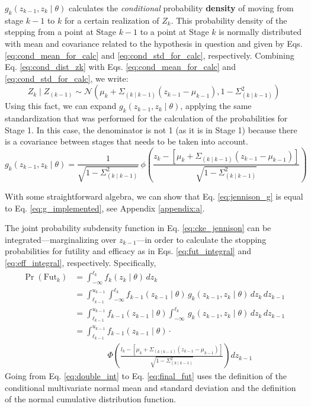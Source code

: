 \documentclass{article}
\begin{document}
$g_k(z_{k-1},z_k\mid \theta)$ calculates the \textit{conditional} probability \textbf{density} of moving from stage $k-1$ to $k$ for a certain realization of $Z_k$. This probability density of the stepping from a point at Stage $k-1$ to a point at Stage $k$ is normally distributed with mean and covariance related to the hypothesis in question and given by Eqs. \eqref{eq:cond_mean_for_calc} and \eqref{eq:cond_std_for_calc}, respectively. Combining Eq. \eqref{eq:cond_dist_zk} with Eqs. \eqref{eq:cond_mean_for_calc} and \eqref{eq:cond_std_for_calc}, we write:
%
\begin{equation}
    Z_{k}\mid Z_{(k-1)} \sim \mathcal{N}\left(\mu_k + \Sigma_{(k \mid k-1)}(z_{k-1} - \mu_{k-1}), 1 - \Sigma_{(k \mid k-1)}^2\right)
\end{equation}
%
Using this fact, we can expand $g_k(z_{k-1},z_k\mid \theta)$, applying the same standardization that was performed for the calculation of the probabilities for Stage 1. In this case, the denominator is not 1 (as it is in Stage 1) because there is a covariance between stages that needs to be taken into account.
%
\begin{equation} \label{eq:g_implemented}
    g_k(z_{k-1},z_k\mid \theta) = \frac{1}{\sqrt{1 - \Sigma_{(k \mid k-1)}^2}}\,\phi\left(\frac{z_k-\left[\mu_k + \Sigma_{(k \mid k-1)}(z_{k-1} - \mu_{k-1})\right]}{\sqrt{1 - \Sigma_{(k \mid k-1)}^2}}\right)
\end{equation}

With some straightforward algebra, we can show that Eq. \eqref{eq:jennison_g} is equal to Eq. \eqref{eq:g_implemented}, see Appendix \ref{appendix:a}. 

The joint probability subdensity function in Eq. \eqref{eq:cke_jennison} can be integrated---marginalizing over $z_{k-1}$---in order to calculate the stopping probabilities for futility and efficacy as in Eqs. \eqref{eq:fut_integral} and \eqref{eq:eff_integral}, respectively. Specifically,
%
\begin{align}
    \Pr(\mathrm{Fut}_k) &= \int_{-\infty}^{\ell_{k}} f_k(z_k\mid\theta)\,dz_k\\
    &=\int_{\ell_{k-1}}^{u_{k-1}}\int_{-\infty}^{\ell_{k}} f_{k-1}(z_{k-1}\mid\theta)\,g_k(z_{k-1},z_k\mid\theta)\,dz_k\, dz_{k-1} \\
    &= \int_{\ell_{k-1}}^{u_{k-1}}f_{k-1}(z_{k-1}\mid\theta) \int_{-\infty}^{\ell_{k}} \,g_k(z_{k-1},z_k\mid\theta)\,dz_k \,dz_{k-1}\label{eq:double_int} \\
    &= \int_{\ell_{k-1}}^{u_{k-1}}f_{k-1}(z_{k-1}\mid\theta)\cdot \nonumber \\
    &\qquad\qquad \Phi\left( \frac{l_k -\left[\mu_k + \Sigma_{(k \mid k-1)}(z_{k-1} - \mu_{k-1})\right]}{\sqrt{1 - \Sigma_{(k \mid k-1)}^2}} \right) dz_{k-1} \label{eq:final_fut}
\end{align}
%
Going from Eq. \eqref{eq:double_int} to Eq. \eqref{eq:final_fut} uses the definition of the conditional multivariate normal mean and standard deviation and the definition of the normal cumulative distribution function.
\end{document}
